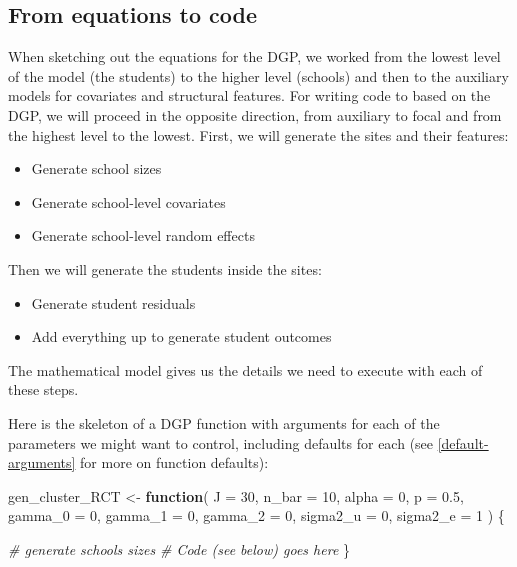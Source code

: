\documentclass[
]{book}
\newenvironment{Shaded}{\begin{snugshade}}{\end{snugshade}}
\newcommand{\AttributeTok}[1]{\textcolor[rgb]{0.13,0.29,0.53}{#1}}
\newcommand{\CommentTok}[1]{\textcolor[rgb]{0.56,0.35,0.01}{\textit{#1}}}
\newcommand{\ControlFlowTok}[1]{\textcolor[rgb]{0.13,0.29,0.53}{\textbf{#1}}}
\newcommand{\DecValTok}[1]{\textcolor[rgb]{0.00,0.00,0.81}{#1}}
\newcommand{\FloatTok}[1]{\textcolor[rgb]{0.00,0.00,0.81}{#1}}
\newcommand{\NormalTok}[1]{#1}
\newcommand{\OtherTok}[1]{\textcolor[rgb]{0.56,0.35,0.01}{#1}}
\providecommand{\tightlist}{%
  \setlength{\itemsep}{0pt}\setlength{\parskip}{0pt}}
\begin{document}
\subsection{From equations to code}\label{from-equations-to-code}

When sketching out the equations for the DGP, we worked from the lowest level of the model (the students) to the higher level (schools) and then to the auxiliary models for covariates and structural features.
For writing code to based on the DGP, we will proceed in the opposite direction, from auxiliary to focal and from the highest level to the lowest.
First, we will generate the sites and their features:

\begin{itemize}
\tightlist
\item
  Generate school sizes
\item
  Generate school-level covariates
\item
  Generate school-level random effects
\end{itemize}

Then we will generate the students inside the sites:

\begin{itemize}
\tightlist
\item
  Generate student residuals
\item
  Add everything up to generate student outcomes
\end{itemize}

The mathematical model gives us the details we need to execute with each of these steps.

Here is the skeleton of a DGP function with arguments for each of the parameters we might want to control, including defaults for each (see \ref{default-arguments} for more on function defaults):

\begin{Shaded}
\begin{Highlighting}[]
\NormalTok{gen\_cluster\_RCT }\OtherTok{\textless{}{-}} \ControlFlowTok{function}\NormalTok{(}
    \AttributeTok{J =} \DecValTok{30}\NormalTok{,}
    \AttributeTok{n\_bar =} \DecValTok{10}\NormalTok{,}
    \AttributeTok{alpha =} \DecValTok{0}\NormalTok{,}
    \AttributeTok{p =} \FloatTok{0.5}\NormalTok{,}
    \AttributeTok{gamma\_0 =} \DecValTok{0}\NormalTok{, }\AttributeTok{gamma\_1 =} \DecValTok{0}\NormalTok{, }\AttributeTok{gamma\_2 =} \DecValTok{0}\NormalTok{,}
    \AttributeTok{sigma2\_u =} \DecValTok{0}\NormalTok{, }\AttributeTok{sigma2\_e =} \DecValTok{1}
\NormalTok{) \{}
  
  \CommentTok{\# generate schools sizes }
  \CommentTok{\# Code (see below) goes here}
\NormalTok{\}}
\end{Highlighting}
\end{Shaded}
\end{document}
